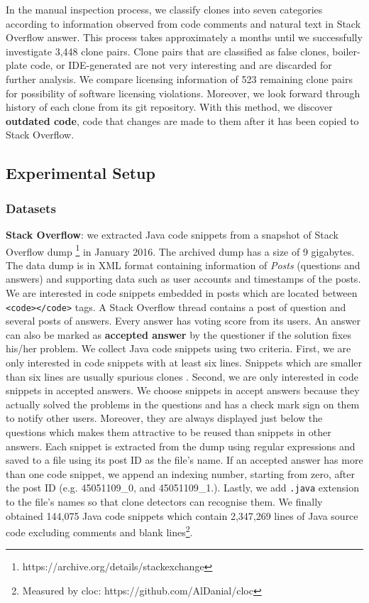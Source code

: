\documentclass{sig-alternate-05-2015}
\begin{document}
In the manual inspection process, we classify clones into seven categories according to information observed from code comments and natural text in Stack Overflow answer. This process takes approximately a months until we successfully investigate 3,448 clone pairs. Clone pairs that are classified as false clones, boiler-plate code, or IDE-generated are not very interesting and are discarded for further analysis. 
We compare licensing information of 523 remaining clone pairs for possibility of software licensing violations. Moreover, we look forward through history of each clone from its git repository. With this method, we discover \textbf{outdated code}, code that changes are made to them after it has been copied to Stack Overflow. %

\subsection{Experimental Setup}

\subsubsection{Datasets}

\textbf{Stack Overflow}: we extracted Java code snippets from a snapshot of Stack Overflow dump \footnote{https://archive.org/details/stackexchange} in January 2016. The archived dump has a size of 9 gigabytes. The data dump is in XML format containing information of \textit{Posts} (questions and answers) and supporting data such as user accounts and timestamps of the posts. We are interested in code snippets embedded in posts which are located between \texttt{<code></code>} tags. A Stack Overflow thread contains a post of question and several posts of answers. Every answer has voting score from its users. An answer can also be marked as \textbf{accepted answer} by the questioner if the solution fixes his/her problem. We collect Java code snippets using two criteria. First, we are only interested in code snippets with at least six lines. Snippets which are smaller than six lines are usually spurious clones \cite{Bellon2007}. Second, we are only interested in code snippets in accepted answers. We choose snippets in accept answers because they actually solved the problems in the questions and has a check mark sign on them to notify other users. Moreover, they are always displayed just below the questions which makes them attractive to be reused than snippets in other answers. Each snippet is extracted from the dump using regular expressions and saved to a file using its post ID as the file's name. If an accepted answer has more than one code snippet, we append an indexing number, starting from zero, after the post ID (e.g. 45051109\_0, and 45051109\_1.). Lastly, we add \texttt{.java} extension to the file's names so that clone detectors can recognise them. We finally obtained 144,075 Java code snippets which contain 2,347,269 lines of Java source code excluding comments and blank lines\footnote{Measured by cloc: https://github.com/AlDanial/cloc}.
\end{document}
